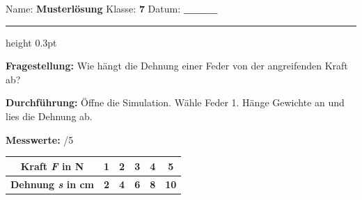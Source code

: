 \documentclass[10pt,a4paper]{article}
\newcommand{\lsg}[1]{\textcolor{loesung}{\textbf{#1}}}
\newcommand{\punkte}[1]{\hfill\textcolor{grau}{\small/#1}}
\newcommand{\fv}[1]{\textit{#1}}
\begin{document}

\vspace{5mm}

{\small Name: \lsg{Musterlösung} \hfill Klasse: \lsg{7} \hfill Datum: \lsg{\_\_\_\_}}

\vspace{2mm}
\hrule height 0.3pt
\vspace{3mm}

\textbf{\textcolor{physik}{Fragestellung:}} Wie hängt die Dehnung einer Feder von der angreifenden Kraft ab?

\vspace{2mm}

\textbf{\textcolor{physik}{Durchführung:}} Öffne die Simulation. Wähle Feder 1. Hänge Gewichte an und lies die Dehnung ab.

\vspace{3mm}

\textbf{\textcolor{physik}{Messwerte:}} \punkte{5}

\vspace{2mm}

\begin{center}
\begin{tabular}{|c|c|c|c|c|c|}
\hline
\rowcolor{hellgrau}
\textbf{Kraft \fv{F} in N} & 1 & 2 & 3 & 4 & 5 \\
\hline
\textbf{Dehnung \fv{s} in cm} & \lsg{2} & \lsg{4} & \lsg{6} & \lsg{8} & \lsg{10} \\[6mm]
\hline
\end{tabular}
\end{center}

\vspace{3mm}
\end{document}
